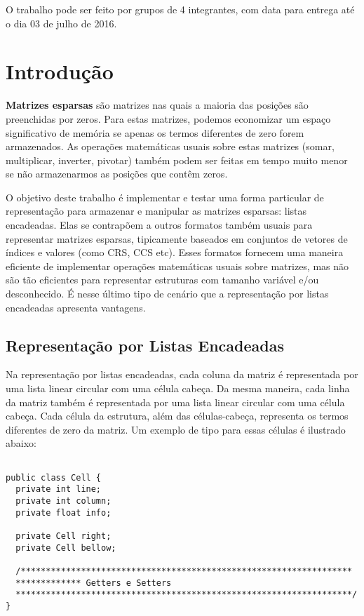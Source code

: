 \documentclass[a4paper,10pt]{article}
\begin{document}
O trabalho pode ser feito por grupos de 4 integrantes, com data para entrega até o dia 03 de julho de 2016.

\section*{Introdução}

\textbf{Matrizes esparsas} são matrizes nas quais a maioria das posições são preenchidas por zeros. Para estas matrizes, podemos economizar um espaço significativo de memória se apenas os termos diferentes de zero forem armazenados. As operações matemáticas usuais sobre estas matrizes (somar, multiplicar, inverter, pivotar) também podem ser feitas em tempo muito menor se não armazenarmos as posições que contêm zeros.

O objetivo deste trabalho é implementar e testar uma forma particular de representação para armazenar e manipular as matrizes esparsas: listas encadeadas. Elas se contrapõem a outros formatos também usuais para representar matrizes esparsas, tipicamente baseados em conjuntos de vetores de índices e valores (como CRS, CCS etc). Esses formatos fornecem uma maneira eficiente de implementar operações matemáticas usuais sobre matrizes, mas não são tão eficientes para representar estruturas com tamanho variável e/ou desconhecido. É nesse último tipo de cenário que a representação por listas encadeadas apresenta vantagens.

\subsection*{Representação por Listas Encadeadas}

Na representação por listas encadeadas, cada coluna da matriz é representada por uma lista linear circular com uma célula cabeça. Da mesma maneira, cada linha da matriz também é representada por uma lista linear circular com uma célula cabeça. Cada célula da estrutura, além das células-cabeça, representa os termos diferentes de zero da matriz. Um exemplo de tipo para essas células é ilustrado abaixo:

\begin{verbatim}

public class Cell {
  private int line;
  private int column;
  private float info;
  
  private Cell right;
  private Cell bellow;
  
  /******************************************************************
  ************* Getters e Setters
  *******************************************************************/
}

\end{verbatim}
\end{document}
